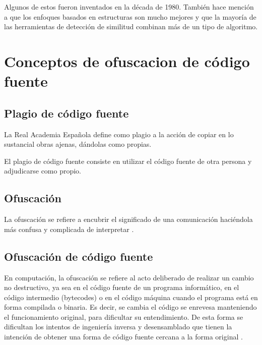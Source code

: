 Algunos de estos fueron inventados en la década de 1980. También hace mención a que los enfoques basados en estructuras son mucho mejores y que la mayoría de las herramientas de detección de similitud combinan más de un tipo de algoritmo.

\section{Conceptos de ofuscacion de código fuente}
\subsection{Plagio de código fuente}
\cite{wiki:Plagiarism} La Real Academia Española define como plagio a la acción de copiar en lo sustancial obras ajenas, dándolas como propias.

El plagio de código fuente consiste en utilizar el código fuente de otra persona y adjudicarse como propio.

\subsection{Ofuscación}
La ofuscación se refiere a encubrir el significado de una comunicación haciéndola más confusa y complicada de interpretar \cite{wiki:Obfuscation_(software)}.

\subsection{Ofuscación de código fuente}
En computación, la ofuscación se refiere al acto deliberado de realizar un cambio no destructivo, ya sea en el código fuente de un programa informático, en el código intermedio (bytecodes) o en el código máquina cuando el programa está en forma compilada o binaria. Es decir, se cambia el código se enrevesa manteniendo el funcionamiento original, para dificultar su entendimiento. De esta forma se dificultan los intentos de ingeniería inversa y desensamblado que tienen la intención de obtener una forma de código fuente cercana a la forma original \cite{wiki:Obfuscation_(software)}.

